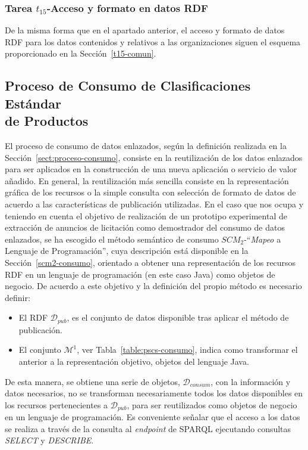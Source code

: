 \subsubsection{Tarea $t_{15}$-Acceso y formato en datos RDF}
De la misma forma que en el apartado anterior, el acceso y formato de datos RDF para los datos contenidos y relativos 
a las organizaciones siguen el esquema proporcionado en la Sección~\ref{t15-comun}.

\subsection{Proceso de Consumo de Clasificaciones Estándar\\ de Productos}
El proceso de consumo de datos enlazados, según la definición realizada en la Sección~\ref{sect:proceso-consumo}, consiste en 
la reutilización de los datos enlazados para ser aplicados en la construcción de una nueva aplicación o servicio de valor 
añadido. En general, la reutilización más sencilla consiste en la representación gráfica de los recursos o la simple 
consulta con selección de formato de datos de acuerdo a las características de publicación utilizadas. En el caso 
que nos ocupa y teniendo en cuenta el objetivo de realización de un prototipo experimental de extracción de anuncios 
de licitación como demostrador del consumo de datos enlazados, se ha escogido el método semántico de consumo $SCM_2$-``\textit{Mapeo} a Lenguaje de Programación'', 
cuya descripción está disponible en la Sección~\ref{scm2-consumo}, orientado a obtener una representación de los recursos RDF en un 
lenguaje de programación (en este caso Java) como objetos de negocio. De acuerdo a este objetivo y la definición del propio método 
es necesario definir:
\begin{itemize}
 \item El \dataset RDF $\mathcal{D}_{pub}$, es el conjunto de datos disponible tras aplicar el método de publicación.
 \item El conjunto $\mathcal{M}^1$, ver Tabla~\ref{table:pscs-consumo}, indica como transformar el \dataset anterior a la representación objetivo, objetos del lenguaje Java.
\end{itemize}

De esta manera, se obtiene una serie de objetos, $\mathcal{D}_{consum}$, con la información y datos necesarios, no se transforman necesariamente todos los datos disponibles en los recursos pertenecientes 
a  $\mathcal{D}_{pub}$, para ser reutilizados como objetos de negocio en un lenguaje de programación. Es conveniente señalar que el acceso a los datos se realiza a través 
de la consulta al \textit{endpoint} de \gls{SPARQL} ejecutando consultas \textit{SELECT} y \textit{DESCRIBE}.

